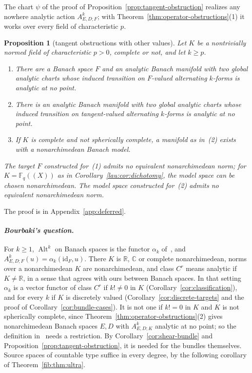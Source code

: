 \documentclass[11pt]{amsart}
\newtheorem{proposition}[theorem]{Proposition}
\theoremstyle{definition}
\theoremstyle{remark}
\numberwithin{equation}{section}
\newcommand{\F}{\mathbb F}
\newcommand{\Alt}{\operatorname{Alt}}
\newcommand{\id}{\mathrm{id}}
\theoremstyle{plain}
\theoremstyle{definition}
\theoremstyle{plain}
\begin{document}
The chart $\psi$ of the proof of Proposition~\ref{prop:tangent-obstruction} realizes any nowhere analytic action $A^k_{E,D;F}$; with Theorem~\ref{thm:operator-obstructions}(1) it works over every field of characteristic $p$.
\begin{proposition}[tangent obstructions with other values]\label{prop:tangent-values}
Let $K$ be a nontrivially normed field of characteristic $p>0$, complete or not, and let $k\ge p$.
\begin{enumerate}
\item There are a Banach space $F$ and an analytic Banach manifold with two global analytic charts whose induced transition on $F$\nobreakdash-valued alternating $k$\nobreakdash-forms is analytic at no point.
\item There is an analytic Banach manifold with two global analytic charts whose induced transition on tangent-valued alternating $k$\nobreakdash-forms is analytic at no point.
\item If $K$ is complete and not spherically complete, a manifold as in~(2) exists with a nonarchimedean Banach model.
\end{enumerate}
The target $F$ constructed for~(1) admits no equivalent nonarchimedean norm; for $K=\F_q((X))$ as in Corollary~\ref{lau:cor:dichotomy}, the model space can be chosen nonarchimedean. The model space constructed for~(2) admits no equivalent nonarchimedean norm.
\end{proposition}
The proof is in Appendix~\ref{app:deferred}.

\paragraph{\textit{Bourbaki's question.}}
For $k\ge1$, $\Alt^k$ on Banach spaces is the functor $\alpha_k$ of~\cite[n\textsuperscript{o}~7.8.1]{Bou}, and $A^k_{E,D;F}(u)=\alpha_k(\id_F,u)$. There $K$ is $\mathbb R$, $\mathbb C$ or complete nonarchimedean, norms over a nonarchimedean $K$ are nonarchimedean, and class $C^r$ means analytic if $K\ne\mathbb R$, in a sense that agrees with ours between Banach spaces. In that setting $\alpha_k$ is a vector functor of class $C^r$ if $k!\ne0$ in $K$ (Corollary~\ref{cor:classification}), and for every $k$ if $K$ is discretely valued (Corollary~\ref{cor:discrete-targets} and the proof of Corollary~\ref{cor:bundle-cases}). It is not one if $k!=0$ in $K$ and $K$ is not spherically complete, since Theorem~\ref{thm:operator-obstructions}(2) gives nonarchimedean Banach spaces $E,D$ with $A^k_{E,D;K}$ analytic at no point; so the definition in~\cite[n\textsuperscript{o}~7.8.1]{Bou} needs a restriction. By Corollary~\ref{cor:shear-bundle} and Proposition~\ref{prop:tangent-obstruction}, it is needed for the bundles themselves. Source spaces of countable type suffice in every degree, by the following corollary of Theorem~\ref{fib:thm:ultra}.
\end{document}
